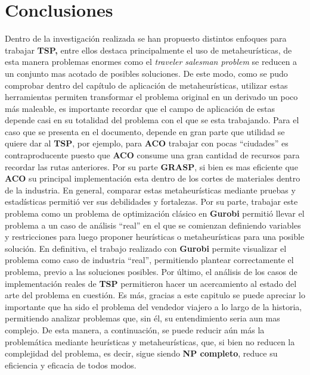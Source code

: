 \chapter{Conclusiones}
\justify
    Dentro de la investigación realizada se han propuesto distintos enfoques para trabajar \textbf{TSP,} entre ellos destaca principalmente el uso de metaheurísticas, de esta manera problemas enormes como el \textit{traveler salesman problem} se reducen a un conjunto mas acotado de posibles soluciones. De este modo, como se pudo comprobar dentro del capítulo de aplicación de metaheurísticas, utilizar estas herramientas permiten transformar el problema original en un derivado un poco más maleable, es importante recordar que el campo de aplicación de estas depende casi en su totalidad del problema con el que se esta trabajando. Para el caso que se presenta en el documento, depende en gran parte que utilidad se quiere dar al \textbf{TSP}, por ejemplo, para \textbf{ACO} trabajar con pocas “ciudades” es contraproducente puesto que \textbf{ACO} consume una gran cantidad de recursos para recordar las rutas anteriores. Por su parte \textbf{GRASP}, si bien es mas eficiente que \textbf{ACO} su principal implementación esta dentro de los cortes de materiales dentro de la industria. En general, comparar estas metaheurísticas mediante pruebas y estadísticas permitió ver sus debilidades y fortalezas.
    \newline
    \newline
    Por su parte, trabajar este problema como un problema de optimización clásico en \textbf{Gurobi} permitió llevar el problema a un caso de análisis “real” en el que se comienzan definiendo variables y restricciones para luego proponer heurísticas o metaheurísticas para una posible solución. En definitiva, el trabajo realizado con \textbf{Gurobi} permite visualizar el problema como caso de industria “real”, permitiendo plantear correctamente el problema, previo a las soluciones posibles.
    \newline
    \newline
    Por último, el análisis de los casos de implementación reales de \textbf{TSP} permitieron hacer un acercamiento al estado del arte del problema en cuestión. Es más, gracias a este capitulo se puede apreciar lo importante que ha sido el problema del vendedor viajero a lo largo de la historia, permitiendo analizar problemas que, sin él, su entendimiento seria aun mas complejo. De esta manera, a continuación, se puede reducir aún más la problemática mediante heurísticas y metaheurísticas, que, si bien no reducen la complejidad del problema, es decir, sigue siendo \textbf{NP completo}, reduce su eficiencia y eficacia de todos modos.
    
